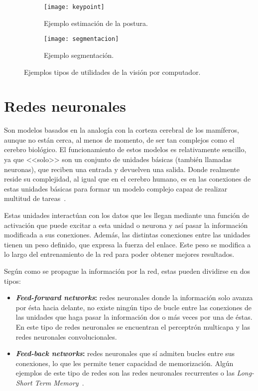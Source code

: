 \begin{figure}[ht]
	\begin{subfigure}{.5\textwidth}
		\centering
		\texttt{[image: keypoint]}  
		\caption{Ejemplo estimación de la postura.}
		\label{fig:keypoint}
	\end{subfigure}
	\begin{subfigure}{.5\textwidth}
		\centering
		\texttt{[image: segmentacion]}  
		\caption{Ejemplo segmentación.}
		\label{fig:segmentation}
	\end{subfigure}
	\caption{Ejemplos tipos de utilidades de la visión por computador.}
	\label{fig:vc}
\end{figure}

\section{Redes neuronales}
Son modelos basados en la analogía con la corteza cerebral de los mamíferos, aunque no están cerca, al menos de momento, de ser tan complejos como el cerebro biológico. El funcionamiento de estos modelos es relativamente sencillo, ya que <<solo>> son un conjunto de unidades básicas (también llamadas neuronas), que reciben una entrada y devuelven una salida. Donde realmente reside su complejidad, al igual que en el cerebro humano, es en las conexiones de estas unidades básicas para formar un modelo complejo capaz de realizar multitud de tareas~\cite{cnn}.

Estas unidades interactúan con los datos que les llegan mediante una función de activación que puede excitar a esta unidad o neurona y así pasar la información modificada a sus conexiones. Además, las distintas conexiones entre las unidades tienen un peso definido, que expresa la fuerza del enlace. Este peso se modifica a lo largo del entrenamiento de la red para poder obtener mejores resultados.

Según como se propague la información por la red, estas pueden dividirse en dos tipos:
\begin{itemize}
	\item \textbf{\textit{Feed-forward networks}:} redes neuronales donde la información solo avanza por ésta hacia delante, no existe ningún tipo de bucle entre las conexiones de las unidades que haga pasar la información dos o más veces por una de éstas. En este tipo de redes neuronales se encuentran el perceptrón multicapa y las redes neuronales convolucionales.
	\item \textbf{\textit{Feed-back networks}:} redes neuronales que sí admiten bucles entre sus conexiones, lo que les permite tener capacidad de memorización. Algún ejemplos de este tipo de redes son las redes neuronales recurrentes o las \textit{Long-Short Term Memory}~\cite{lstm}.
\end{itemize}
